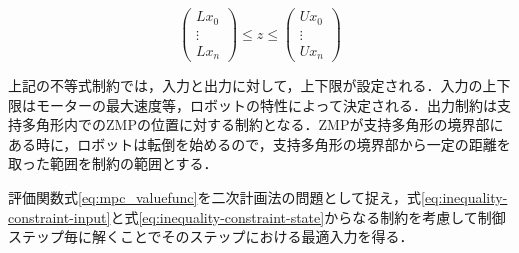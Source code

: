 \begin{equation}
  \begin{pmatrix}
    Lx_{0} \\ \vdots \\ Lx_{n}
  \end{pmatrix}
  \leq z \leq
  \begin{pmatrix}
    Ux_{0} \\ \vdots \\ Ux_{n}
  \end{pmatrix}
  \label{eq:inequality-constraint-state}
\end{equation}


上記の不等式制約では，入力と出力に対して，上下限が設定される．入力の上下限はモーターの最大速度等，ロボットの特性によって決定される．出力制約は支持多角形内でのZMPの位置に対する制約となる．ZMPが支持多角形の境界部にある時に，ロボットは転倒を始めるので，支持多角形の境界部から一定の距離を取った範囲を制約の範囲とする．

評価関数式\eqref{eq:mpc_valuefunc}を二次計画法の問題として捉え，式\eqref{eq:inequality-constraint-input}と式\eqref{eq:inequality-constraint-state}からなる制約を考慮して制御ステップ毎に解くことでそのステップにおける最適入力を得る．